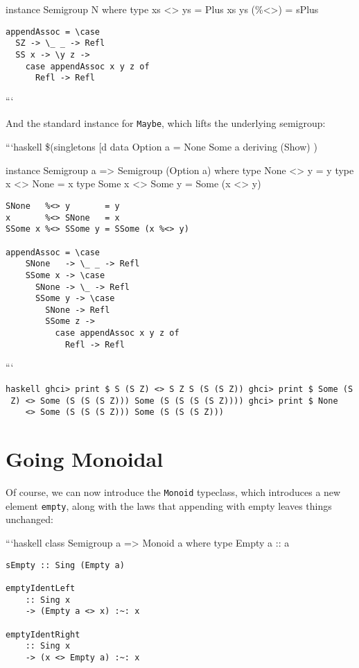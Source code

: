 \documentclass[]{article}
\begin{document}
instance Semigroup N where type xs \textless{}\textgreater{} ys = Plus xs ys
(\%\textless{}\textgreater{}) = sPlus

\begin{verbatim}
appendAssoc = \case
  SZ -> \_ _ -> Refl
  SS x -> \y z ->
    case appendAssoc x y z of
      Refl -> Refl
\end{verbatim}

```

And the standard instance for \texttt{Maybe}, which lifts the underlying
semigroup:

```haskell \$(singletons {[}d\textbar{} data Option a = None \textbar{} Some a
deriving (Show) \textbar{}{]})

instance Semigroup a =\textgreater{} Semigroup (Option a) where type None
\textless{}\textgreater{} y = y type x \textless{}\textgreater{} None = x type
Some x \textless{}\textgreater{} Some y = Some (x \textless{}\textgreater{} y)

\begin{verbatim}
SNone   %<> y       = y
x       %<> SNone   = x
SSome x %<> SSome y = SSome (x %<> y)

appendAssoc = \case
    SNone   -> \_ _ -> Refl
    SSome x -> \case
      SNone -> \_ -> Refl
      SSome y -> \case
        SNone -> Refl
        SSome z ->
          case appendAssoc x y z of
            Refl -> Refl
\end{verbatim}

```

\texttt{haskell\ ghci\textgreater{}\ print\ \$\ S\ (S\ Z)\ \textless{}\textgreater{}\ S\ Z\ S\ (S\ (S\ Z))\ ghci\textgreater{}\ print\ \$\ Some\ (S\ Z)\ \textless{}\textgreater{}\ Some\ (S\ (S\ (S\ Z)))\ Some\ (S\ (S\ (S\ (S\ Z))))\ ghci\textgreater{}\ print\ \$\ None\ \ \ \ \ \ \ \textless{}\textgreater{}\ Some\ (S\ (S\ (S\ Z)))\ Some\ (S\ (S\ (S\ Z)))}

\section{Going Monoidal}

Of course, we can now introduce the \texttt{Monoid} typeclass, which introduces
a new element \texttt{empty}, along with the laws that appending with empty
leaves things unchanged:

```haskell class Semigroup a =\textgreater{} Monoid a where type Empty a :: a

\begin{verbatim}
sEmpty :: Sing (Empty a)

emptyIdentLeft
    :: Sing x
    -> (Empty a <> x) :~: x

emptyIdentRight
    :: Sing x
    -> (x <> Empty a) :~: x
\end{verbatim}
\end{document}
